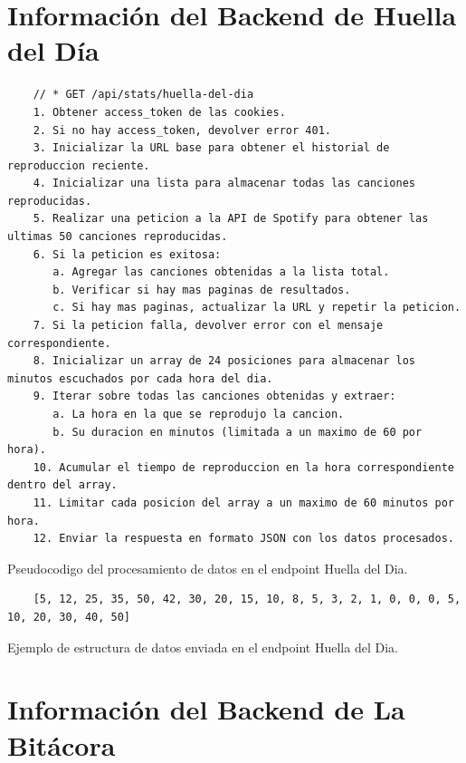 \section{Información del Backend de Huella del Día} \label{sec:backend_huella_del_dia}

\begin{ifalgorithm}[H]
  \begin{lstlisting}
    // * GET /api/stats/huella-del-dia
    1. Obtener access_token de las cookies.
    2. Si no hay access_token, devolver error 401.
    3. Inicializar la URL base para obtener el historial de reproduccion reciente.
    4. Inicializar una lista para almacenar todas las canciones reproducidas.
    5. Realizar una peticion a la API de Spotify para obtener las ultimas 50 canciones reproducidas.
    6. Si la peticion es exitosa:
       a. Agregar las canciones obtenidas a la lista total.
       b. Verificar si hay mas paginas de resultados.
       c. Si hay mas paginas, actualizar la URL y repetir la peticion.
    7. Si la peticion falla, devolver error con el mensaje correspondiente.
    8. Inicializar un array de 24 posiciones para almacenar los minutos escuchados por cada hora del dia.
    9. Iterar sobre todas las canciones obtenidas y extraer:
       a. La hora en la que se reprodujo la cancion.
       b. Su duracion en minutos (limitada a un maximo de 60 por hora).
    10. Acumular el tiempo de reproduccion en la hora correspondiente dentro del array.
    11. Limitar cada posicion del array a un maximo de 60 minutos por hora.
    12. Enviar la respuesta en formato JSON con los datos procesados.
    \end{lstlisting}
  \caption{Pseudocodigo del procesamiento de datos en el endpoint Huella del Dia.}
  \label{alg:huella_del_dia}
\end{ifalgorithm}

\begin{ifalgorithm}[H]
  \begin{lstlisting}
    [5, 12, 25, 35, 50, 42, 30, 20, 15, 10, 8, 5, 3, 2, 1, 0, 0, 0, 5, 10, 20, 30, 40, 50]
    \end{lstlisting}
  \caption{Ejemplo de estructura de datos enviada en el endpoint Huella del Dia.}
  \label{alg:huella_del_dia_response}
\end{ifalgorithm}

\section{Información del Backend de La Bitácora} \label{sec:backend_la_bitacora}

